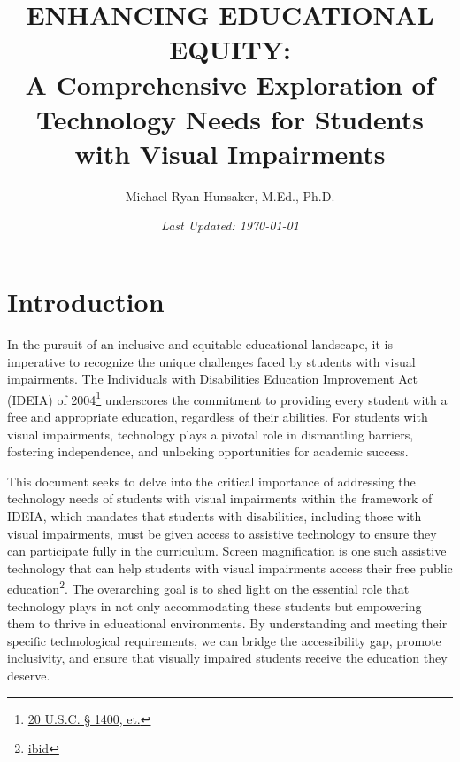 \documentclass[14pt,letterpaper,twoside]{extreport}
\title{\Huge ENHANCING EDUCATIONAL EQUITY: \\ \Large A Comprehensive Exploration of Technology Needs for Students with Visual Impairments}
\author{Michael Ryan Hunsaker, M.Ed., Ph.D.}
\date{\vfill \textit{Last Updated: {\today}}}
\begin{document}
\maketitle
{}
\setcounter{tocdepth}{3}
\cleardoublepage
{}
\tableofcontents
{\listoffigures\let\clearpage\relax\vskip10pt\listoftables}
\newpage{}
\fancyhead{}
\fancyfoot{}


\hypertarget{intro}{}\chapter*{Introduction}\label{intro}
\pagestyle{fancyplain}       
\fancyfoot[C]{\thepage}
In the pursuit of an inclusive and equitable educational landscape, it is imperative to recognize the unique challenges faced by students with visual impairments. The Individuals with Disabilities Education Improvement Act (IDEIA) of 2004\footnote{\href{https://sites.ed.gov/idea/statuteregulations/}{20 U.S.C. § 1400, et.}} underscores the commitment to providing every student with a free and appropriate education, regardless of their abilities. For students with visual impairments, technology plays a pivotal role in dismantling barriers, fostering independence, and unlocking opportunities for academic success.

This document seeks to delve into the critical importance of addressing the technology needs of students with visual impairments within the framework of IDEIA, which mandates that students with disabilities, including those with visual impairments, must be given access to assistive technology to ensure they can participate fully in the curriculum. Screen magnification is one such assistive technology that can help students with visual impairments access their free public education\footnote{\href{https://sites.ed.gov/idea/statuteregulations/}{ibid}}. The overarching goal is to shed light on the essential role that technology plays in not only accommodating these students but empowering them to thrive in educational environments. By understanding and meeting their specific technological requirements, we can bridge the accessibility gap, promote inclusivity, and ensure that visually impaired students receive the education they deserve.
\end{document}

